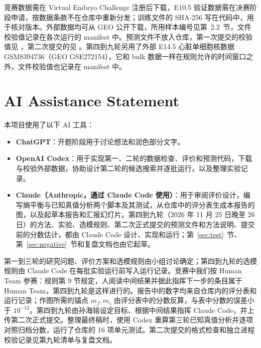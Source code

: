 \documentclass[UTF8,zihao=-4,fontset=none,a4paper]{ctexart}
\begin{document}
竞赛数据需在 Virtual Embryo Challenge 注册后下载\cite{data}，E10.5 验证数据需在决赛阶段申请，按数据条款不在仓库中重新分发；训练文件的 SHA-256 写在代码中，用于核对版本。外部数据均可从 GEO 公开下载，所用样本编号见第~2.2~节，文件校验值记录在各次运行的 manifest 中。预测文件不放入仓库，第一次提交的校验值见 ，第二次提交的见 。第四到九轮另用了外部 E14.5 心脏单细胞核数据 GSM8394736（GEO GSE272154），它和 bulk 数据一样在规则允许的时间窗口之外，文件校验值也记录在 manifest 中。

\section*{AI Assistance Statement}

本项目使用了以下 AI 工具：
\begin{itemize}
  \item \textbf{ChatGPT}：开题阶段用于讨论想法和润色部分文字。
  \item \textbf{OpenAI Codex}：用于实现第一、二轮的数据检查、评价和预测代码，下载与校验外部数据，协助设计第二轮的候选搜索并逐批运行，以及整理实验记录。
  \item \textbf{Claude（Anthropic，通过 Claude Code 使用）}：用于审阅评价设计，编写熵平衡与已知真值分析两个脚本及其测试，从仓库中的评分表生成本报告的图，以及起草本报告和汇报幻灯片。第四到九轮（2026 年 11 月 25 日晚至 26 日）的方法、实验、选模规则、第二次正式提交的预测文件和方法说明、提交前的分数估计，都由 Claude Code 设计、实现和运行；第~\ref{sec:test}~节、第~\ref{sec:negative}~节和复盘文档也由它起草。
\end{itemize}
第一到三轮的研究问题、评价方案和选模规则由小组讨论确定；第四到九轮的选模规则由 Claude Code 在每批实验运行前写入运行记录。竞赛中我们按 Human Team 参赛：规则第 9 节规定，人阅读中间结果并据此指挥下一步的条目属于 Human Team\cite{rules}，第四到九轮是这样进行的。报告中的数字均来自仓库内的评分表和运行记录；作图所需的锚点 $m_f,m_c$ 由评分表中的分数反算，与表中分数的误差小于 $10^{-12}$。第四到九轮由孙海铭设定目标、根据中间结果指挥 Claude Code，并上传第二次正式提交。整理最终稿时，使用 Codex 重算第三轮已知真值分析并逐项对照归档分数，运行了仓库的 16 项单元测试。第二次提交的格式检查和独立进程校验记录见第九轮清单与复盘文档。
\end{document}

